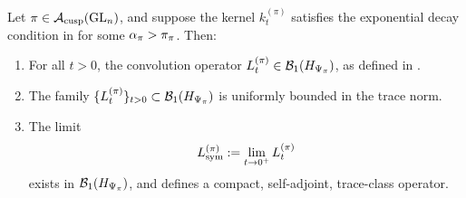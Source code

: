 \begin{lemma}
\label{lem:trace_class_convergence_general}
Let \( \pi \in \mathcal{A}_{\mathrm{cusp}}(\mathrm{GL}_n) \), and suppose the kernel \( k_t^{(\pi)} \) satisfies the exponential decay condition in  for some \( \alpha_{\pi} > \pi_\pi \). Then:
\begin{enumerate}
  \item For all \( t > 0 \), the convolution operator \( L_t^{(\pi)} \in \mathcal{B}_1(H_{\Psi_{\pi}}) \), as defined in .
  
  \item The family \( \{ L_t^{(\pi)} \}_{t > 0} \subset \mathcal{B}_1(H_{\Psi_{\pi}}) \) is uniformly bounded in the trace norm.
  
  \item The limit
  \[
  L_{\mathrm{sym}}^{(\pi)} := \lim_{t \to 0^+} L_t^{(\pi)}
  \]
  exists in \( \mathcal{B}_1(H_{\Psi_{\pi}}) \), and defines a compact, self-adjoint, trace-class operator.
\end{enumerate}
\end{lemma}
